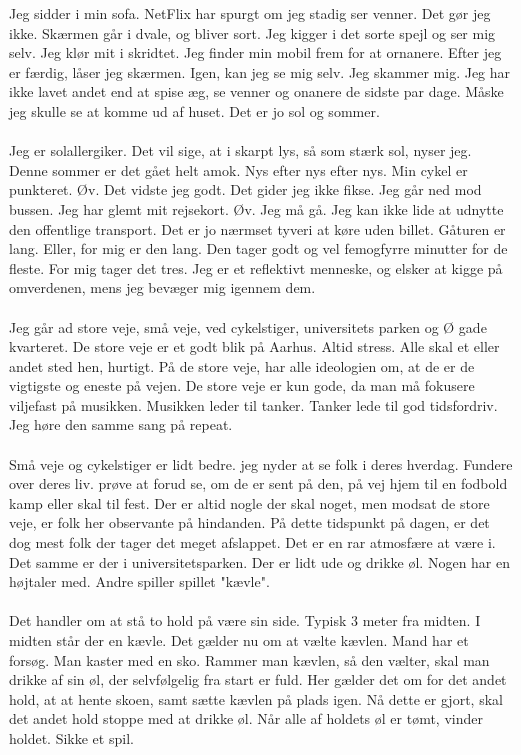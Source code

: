 \documentclass[]{article}
\begin{document}
Jeg sidder i min sofa. NetFlix har spurgt om jeg stadig ser venner. Det gør jeg ikke. Skærmen går i dvale, og bliver sort. Jeg kigger i det sorte spejl og ser mig selv. Jeg klør mit i skridtet. Jeg finder min mobil frem for at ornanere. Efter jeg er færdig, låser jeg skærmen. Igen, kan jeg se mig selv. Jeg skammer mig. Jeg har ikke lavet andet end at spise æg, se venner og onanere de sidste par dage. Måske jeg skulle se at komme ud af huset. Det er jo sol og sommer.
\\ \\
Jeg er solallergiker. Det vil sige, at i skarpt lys, så som stærk sol, nyser jeg. Denne sommer er det gået helt amok. Nys efter nys efter nys. Min cykel er punkteret. Øv. Det vidste jeg godt. Det gider jeg ikke fikse. Jeg går ned mod bussen. Jeg har glemt mit rejsekort. Øv. Jeg må gå. Jeg kan ikke lide at udnytte den offentlige transport. Det er jo nærmset tyveri at køre uden billet. Gåturen er lang. Eller, for mig er den lang. Den tager godt og vel femogfyrre minutter for de fleste. For mig tager det tres. Jeg er et reflektivt menneske, og elsker at kigge på omverdenen, mens jeg bevæger mig igennem dem.
\\ \\
Jeg går ad store veje, små veje, ved cykelstiger, universitets parken og Ø gade kvarteret. De store veje er et godt blik på Aarhus. Altid stress. Alle skal et eller andet sted hen, hurtigt. På de store veje, har alle ideologien om, at de er de vigtigste og eneste på vejen. De store veje er kun gode, da man må fokusere viljefast på musikken. Musikken leder til tanker. Tanker lede til god tidsfordriv. Jeg høre den samme sang på repeat.
\\ \\
Små veje og cykelstiger er lidt bedre. jeg nyder at se folk i deres hverdag. Fundere over deres liv. prøve at forud se, om de er sent på den, på vej hjem til en fodbold kamp eller skal til fest. Der er altid nogle der skal noget, men modsat de store veje, er folk her observante på hindanden. På dette tidspunkt på dagen, er det dog mest folk der tager det meget afslappet. Det er en rar atmosfære at være i. Det samme er der i universitetsparken. Der er lidt ude og drikke øl. Nogen har en højtaler med. Andre spiller spillet "kævle". 
\\ \\
Det handler om at stå to hold på være sin side. Typisk 3 meter fra midten. I midten står der en kævle. Det gælder nu om at vælte kævlen. Mand har et forsøg. Man kaster med en sko. Rammer man kævlen, så den vælter, skal man drikke af sin øl, der selvfølgelig fra start er fuld. Her gælder det om for det andet hold, at at hente skoen, samt sætte kævlen på plads igen. Nå dette er gjort, skal det andet hold stoppe med at drikke øl. Når alle af holdets øl er tømt, vinder holdet. Sikke et spil.
\end{document}
